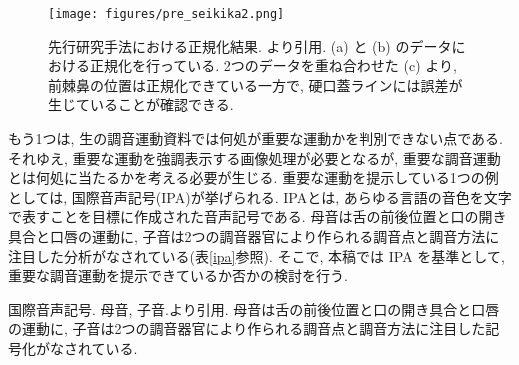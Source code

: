 \begin{figure}[hbtp]
 \centering
   \texttt{[image: figures/pre\_seikika2.png]}
 \caption[先行研究手法における正規化結果]{先行研究手法における正規化結果. \cite{honda_seikika}より引用. (a) と (b) のデータにおける正規化を行っている. 2つのデータを重ね合わせた (c) より, 前棘鼻の位置は正規化できている一方で, 硬口蓋ラインには誤差が生じていることが確認できる.}
 \label{pca_pre2}
\end{figure}

もう1つは, 生の調音運動資料では何処が重要な運動かを判別できない点である. それゆえ, 重要な運動を強調表示する画像処理が必要となるが, 重要な調音運動とは何処に当たるかを考える必要が生じる.
重要な運動を提示している1つの例としては, 国際音声記号(IPA)\cite{ipa_doc}が挙げられる. IPAとは, あらゆる言語の音色を文字で表すことを目標に作成された音声記号である. 母音は舌の前後位置と口の開き具合と口唇の運動に, 子音は2つの調音器官により作られる調音点と調音方法に注目した分析がなされている(表\ref{ipa}参照). そこで, 本稿では IPA を基準として, 重要な調音運動を提示できているか否かの検討を行う.

\begin{table}[hbtp]
 \centering
 \caption[国際音声記号]{国際音声記号.  母音, 子音.\cite{ipa_doc}より引用. 母音は舌の前後位置と口の開き具合と口唇の運動に, 子音は2つの調音器官により作られる調音点と調音方法に注目した記号化がなされている. }
  \quad
 \label{ipa}
\end{table}

